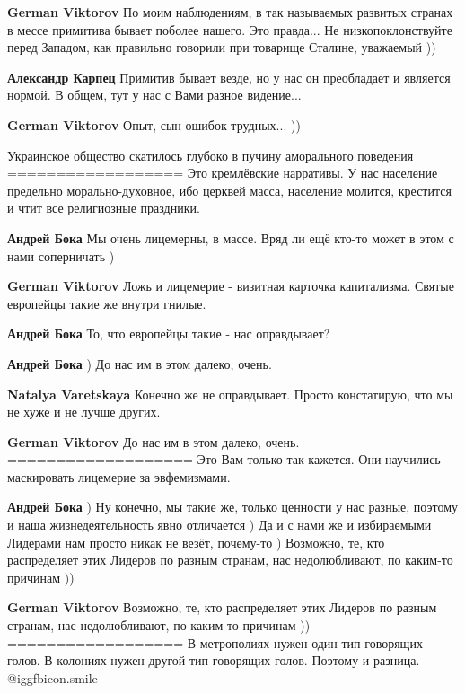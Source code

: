 \begin{itemize}
\begin{itemize}
\textbf{German Viktorov} По моим наблюдениям, в так называемых развитых странах в мессе примитива бывает поболее нашего. Это правда...
Не низкопоклонствуйте перед Западом, как правильно говорили при товарище Сталине, уважаемый ))

\textbf{Александр Карпец} Примитив бывает везде, но у нас он преобладает и является нормой. В общем, тут у нас с Вами разное видение...

\textbf{German Viktorov} Опыт, сын ошибок трудных... ))
\end{itemize} %

Украинское общество скатилось глубоко в пучину аморального поведения
==================
Это кремлёвские нарративы.  У нас население предельно морально-духовное, ибо
церквей масса, население молится, крестится и чтит все религиозные праздники.

\begin{itemize} %
\textbf{Андрей Бока} Мы очень лицемерны, в массе. Вряд ли ещё кто-то может в этом с нами соперничать )

\textbf{German Viktorov} Ложь и лицемерие - визитная карточка капитализма.
Святые европейцы такие же внутри гнилые.

\textbf{Андрей Бока} То, что европейцы такие - нас оправдывает?

\textbf{Андрей Бока} ) До нас им в этом далеко, очень.

\textbf{Natalya Varetskaya} Конечно же не оправдывает.
Просто констатирую, что мы не хуже и не лучше других.

\textbf{German Viktorov} До нас им в этом далеко, очень.
===================
Это Вам только так кажется.
Они научились маскировать лицемерие за эвфемизмами.

\textbf{Андрей Бока} ) Ну конечно, мы такие же, только ценности у нас разные, поэтому и наша жизнедеятельность явно отличается ) Да и с нами же и избираемыми Лидерами нам просто никак не везёт, почему-то ) Возможно, те, кто распределяет этих Лидеров по разным странам, нас недолюбливают, по каким-то причинам ))

\textbf{German Viktorov} Возможно, те, кто распределяет этих Лидеров по разным странам, нас недолюбливают, по каким-то причинам ))
==================
В метрополиях нужен один тип говорящих голов.
В колониях нужен другой тип говорящих голов.
Поэтому и разница.
 @igg{fbicon.smile} 


\end{itemize}
\end{itemize}
